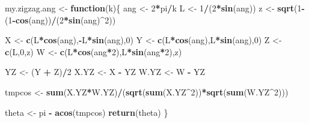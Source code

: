 \documentclass[]{article}
\newenvironment{Shaded}{\begin{snugshade}}{\end{snugshade}}
\newcommand{\KeywordTok}[1]{\textcolor[rgb]{0.13,0.29,0.53}{\textbf{#1}}}
\newcommand{\DecValTok}[1]{\textcolor[rgb]{0.00,0.00,0.81}{#1}}
\newcommand{\StringTok}[1]{\textcolor[rgb]{0.31,0.60,0.02}{#1}}
\newcommand{\ControlFlowTok}[1]{\textcolor[rgb]{0.13,0.29,0.53}{\textbf{#1}}}
\newcommand{\OperatorTok}[1]{\textcolor[rgb]{0.81,0.36,0.00}{\textbf{#1}}}
\newcommand{\NormalTok}[1]{#1}
\begin{document}
\begin{Shaded}
\begin{Highlighting}[]
\NormalTok{my.zigzag.ang <-}\StringTok{ }\ControlFlowTok{function}\NormalTok{(k)\{}
\NormalTok{  ang <-}\StringTok{ }\DecValTok{2}\OperatorTok{*}\NormalTok{pi}\OperatorTok{/}\NormalTok{k}
\NormalTok{  L <-}\StringTok{ }\DecValTok{1}\OperatorTok{/}\NormalTok{(}\DecValTok{2}\OperatorTok{*}\KeywordTok{sin}\NormalTok{(ang))}
\NormalTok{  z <-}\StringTok{ }\KeywordTok{sqrt}\NormalTok{(}\DecValTok{1}\OperatorTok{-}\NormalTok{(}\DecValTok{1}\OperatorTok{-}\KeywordTok{cos}\NormalTok{(ang))}\OperatorTok{/}\NormalTok{(}\DecValTok{2}\OperatorTok{*}\KeywordTok{sin}\NormalTok{(ang)}\OperatorTok{^}\DecValTok{2}\NormalTok{))}
  
\NormalTok{  X <-}\StringTok{ }\KeywordTok{c}\NormalTok{(L}\OperatorTok{*}\KeywordTok{cos}\NormalTok{(ang),}\OperatorTok{-}\NormalTok{L}\OperatorTok{*}\KeywordTok{sin}\NormalTok{(ang),}\DecValTok{0}\NormalTok{)}
\NormalTok{  Y <-}\StringTok{ }\KeywordTok{c}\NormalTok{(L}\OperatorTok{*}\KeywordTok{cos}\NormalTok{(ang),L}\OperatorTok{*}\KeywordTok{sin}\NormalTok{(ang),}\DecValTok{0}\NormalTok{)}
\NormalTok{  Z <-}\StringTok{ }\KeywordTok{c}\NormalTok{(L,}\DecValTok{0}\NormalTok{,z)}
\NormalTok{  W <-}\StringTok{ }\KeywordTok{c}\NormalTok{(L}\OperatorTok{*}\KeywordTok{cos}\NormalTok{(ang}\OperatorTok{*}\DecValTok{2}\NormalTok{),L}\OperatorTok{*}\KeywordTok{sin}\NormalTok{(ang}\OperatorTok{*}\DecValTok{2}\NormalTok{),z) }
  
\NormalTok{  YZ <-}\StringTok{ }\NormalTok{(Y }\OperatorTok{+}\StringTok{ }\NormalTok{Z)}\OperatorTok{/}\DecValTok{2}
\NormalTok{  X.YZ <-}\StringTok{ }\NormalTok{X }\OperatorTok{-}\StringTok{ }\NormalTok{YZ}
\NormalTok{  W.YZ <-}\StringTok{ }\NormalTok{W }\OperatorTok{-}\StringTok{ }\NormalTok{YZ}
  
\NormalTok{  tmpcos <-}\StringTok{ }\KeywordTok{sum}\NormalTok{(X.YZ}\OperatorTok{*}\NormalTok{W.YZ)}\OperatorTok{/}\NormalTok{(}\KeywordTok{sqrt}\NormalTok{(}\KeywordTok{sum}\NormalTok{(X.YZ}\OperatorTok{^}\DecValTok{2}\NormalTok{))}\OperatorTok{*}\KeywordTok{sqrt}\NormalTok{(}\KeywordTok{sum}\NormalTok{(W.YZ}\OperatorTok{^}\DecValTok{2}\NormalTok{)))}
  
\NormalTok{  theta <-}\StringTok{ }\NormalTok{pi }\OperatorTok{-}\StringTok{ }\KeywordTok{acos}\NormalTok{(tmpcos)}
  \KeywordTok{return}\NormalTok{(theta)}
\NormalTok{\}}
\end{Highlighting}
\end{Shaded}
\end{document}
